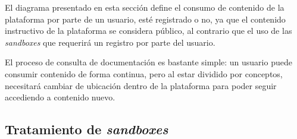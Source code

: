             El diagrama presentado en esta sección define el consumo de contenido de la plataforma por parte de un usuario, esté registrado o no, ya que el contenido instructivo de la plataforma se considera público, al contrario que el uso de las \textit{sandboxes} que requerirá un registro por parte del usuario.
            
            El proceso de consulta de documentación es bastante simple: un usuario puede consumir contenido de forma continua, pero al estar dividido por conceptos, necesitará cambiar de ubicación dentro de la plataforma para poder seguir accediendo a contenido nuevo.
            
            \newpage
            
            
        \subsection{Tratamiento de \textit{sandboxes}}
        

